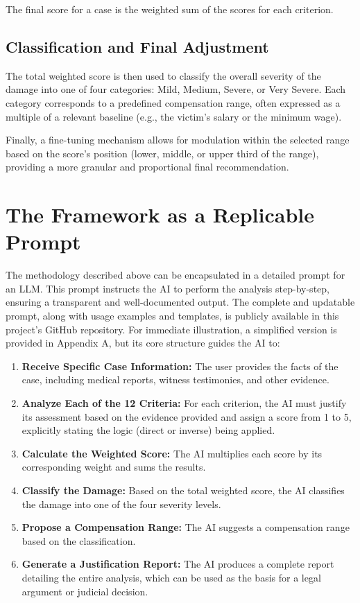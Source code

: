 \documentclass[11pt,a4paper]{article}
\begin{document}
The final score for a case is the weighted sum of the scores for each criterion.

\subsection{Classification and Final Adjustment}

The total weighted score is then used to classify the overall severity of the damage into one of four categories: Mild, Medium, Severe, or Very Severe. Each category corresponds to a predefined compensation range, often expressed as a multiple of a relevant baseline (e.g., the victim's salary or the minimum wage).

Finally, a fine-tuning mechanism allows for modulation within the selected range based on the score's position (lower, middle, or upper third of the range), providing a more granular and proportional final recommendation.

\section{The Framework as a Replicable Prompt}

The methodology described above can be encapsulated in a detailed prompt for an LLM. This prompt instructs the AI to perform the analysis step-by-step, ensuring a transparent and well-documented output. The complete and updatable prompt, along with usage examples and templates, is publicly available in this project's GitHub repository. For immediate illustration, a simplified version is provided in Appendix A, but its core structure guides the AI to:

\begin{enumerate}
    \item \textbf{Receive Specific Case Information:} The user provides the facts of the case, including medical reports, witness testimonies, and other evidence.
    \item \textbf{Analyze Each of the 12 Criteria:} For each criterion, the AI must justify its assessment based on the evidence provided and assign a score from 1 to 5, explicitly stating the logic (direct or inverse) being applied.
    \item \textbf{Calculate the Weighted Score:} The AI multiplies each score by its corresponding weight and sums the results.
    \item \textbf{Classify the Damage:} Based on the total weighted score, the AI classifies the damage into one of the four severity levels.
    \item \textbf{Propose a Compensation Range:} The AI suggests a compensation range based on the classification.
    \item \textbf{Generate a Justification Report:} The AI produces a complete report detailing the entire analysis, which can be used as the basis for a legal argument or judicial decision.
\end{enumerate}
\end{document}
